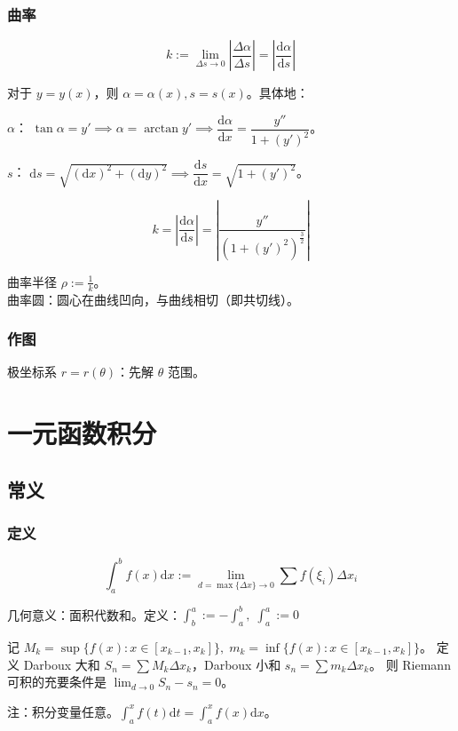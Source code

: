 \documentclass[12pt, a4paper, UTF8, openany]{ctexbook}
\newcommand{\dif}{\mathrm{d}}
\begin{document}
        \subsection{曲率}
        $$k := \lim_{\Delta s \to 0} \left| \frac{\Delta\alpha}{\Delta s} \right| = \left|\frac{\dif\alpha}{\dif s}\right|$$

        对于 $y = y(x)$，则 $\alpha = \alpha(x), s = s(x)$。具体地：

        $\alpha$：
        $\tan\alpha = y' \implies \alpha = \arctan y' \implies \dfrac{\dif\alpha}{\dif x} = \dfrac{y''}{1 + (y')^2}$。

        $s$：
        $\dif s = \sqrt{(\dif x)^2 + (\dif y)^2} \implies \dfrac{\dif s}{\dif x} = \sqrt{1 + (y')^2}$。

        $$k = \left|\frac{\dif\alpha}{\dif s}\right| = \left| \frac{y''}{\left( 1 + (y')^2 \right)^{\frac{3}{2}}} \right|$$

        曲率半径 $\rho := \frac{1}{k}$。\\
        曲率圆：圆心在曲线凹向，与曲线相切（即共切线）。

        \subsection{作图}
        极坐标系 $r = r(\theta)$：先解 $\theta$ 范围。

    \chapter{一元函数积分}
    \section{常义}
        \subsection{定义}
        $$\int_{a}^{b} f(x)\dif x := \lim\limits_{d = \max\{\Delta x\} \to 0} \sum f(\xi_i)\Delta x_i$$

        几何意义：面积代数和。定义：$\int_{b}^{a} := -\int_{a}^{b},\; \int_{a}^{a} := 0$

        记 $M_k = \sup\{f(x): x \in [x_{k - 1}, x_k]\}, \; m_k = \inf\{f(x): x \in [x_{k - 1}, x_k]\}$。
        定义 Darboux 大和 $S_n = \sum M_k\Delta x_k$，Darboux 小和 $s_n = \sum m_k\Delta x_k$。
        则 Riemann 可积的充要条件是 $\lim_{d \to 0} S_n - s_n = 0$。

        注：积分变量任意。$\int_{a}^{x} f(t)\dif t = \int_{a}^{x} f(x)\dif x$。
\end{document}
